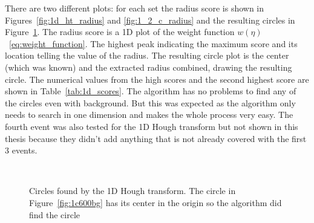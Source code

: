 \documentclass[11pt]{scrreprt}
\begin{document}
There are two different plots: for each set the radius score is shown in Figures~\ref{fig:1d_ht_radius} and \ref{fig:1_2_c_radius} and the resulting
circles in Figure~\ref{fig:1d_ht_results}. The radius score is a 1D plot of the weight function 
$w(\eta)$~\ref{eq:weight_function}. The highest peak indicating the maximum score and its location telling the value of the radius.
The resulting circle plot is the center (which was known) and the extracted radius combined, drawing the resulting circle. 
The numerical values from the high scores and the second highest score are shown in Table~\ref{tab:1d_scores}. 
The algorithm has no problems to find any of  the circles even with background. But this was expected as the 
algorithm only needs to search in one dimension and makes the whole process very easy. The fourth event was also tested for the 1D Hough
transform but not shown in this thesis because they didn't add anything that is not already covered with the first 3 events.

\begin{figure}[htp]
        \centering
        ~ %
                \label{fig:2c0bg}
        ~ %
                \label{fig:5c30bg}
        \caption{Circles found by the 1D Hough transform. The circle in Figure~\ref{fig:1c600bg} has its center in the origin so the algorithm did find the circle}\label{fig:1d_ht_results}
\end{figure}
\end{document}
